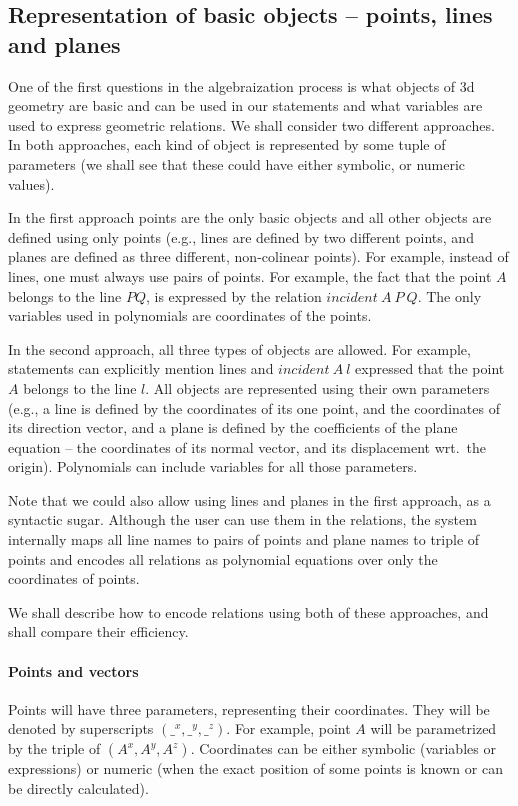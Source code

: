 \documentclass[final,1p,times,authoryear]{elsarticle}
\begin{document}
\subsection{Representation of basic objects -- points, lines and planes}
One of the first questions in the algebraization process is what
objects of 3d geometry are basic and can be used in our statements and
what variables are used to express geometric relations. We shall
consider two different approaches. In both approaches, each kind of
object is represented by some tuple of parameters (we shall see that
these could have either symbolic, or numeric values).

In the first approach points are the only basic objects and all other
objects are defined using only points (e.g., lines are defined by two
different points, and planes are defined as three different,
non-colinear points). For example, instead of lines, one must always
use pairs of points. For example, the fact that the point $A$ belongs
to the line $PQ$, is expressed by the relation $incident\ A\ P\ Q$.
The only variables used in polynomials are coordinates of the points.

In the second approach, all three types of objects are allowed. For
example, statements can explicitly mention lines and $incident\ A\ l$
expressed that the point $A$ belongs to the line $l$. All objects are
represented using their own parameters (e.g., a line is defined by the
coordinates of its one point, and the coordinates of its direction
vector, and a plane is defined by the coefficients of the plane
equation -- the coordinates of its normal vector, and its displacement
wrt.~the origin). Polynomials can include variables for all those
parameters.

Note that we could also allow using lines and planes in the first
approach, as a syntactic sugar. Although the user can use them in the
relations, the system internally maps all line names to pairs of
points and plane names to triple of points and encodes all relations
as polynomial equations over only the coordinates of points.

We shall describe how to encode relations using both of these
approaches, and shall compare their efficiency.

\paragraph{Points and vectors}
Points will have three parameters, representing their
coordinates. They will be denoted by superscripts $({\_}^x, {\_}^y,
{\_}^z)$. For example, point $A$ will be parametrized by the triple of
$(A^x, A^y, A^z)$. Coordinates can be either symbolic (variables or
expressions) or numeric (when the exact position of some points is
known or can be directly calculated).
\end{document}
